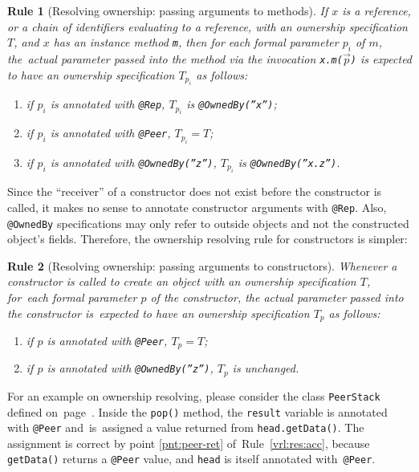 \documentclass{pracamgr}
\theoremstyle{break}
\theoremstyle{break}
\theoremstyle{break}
\newtheorem{verrule}{Rule}
\begin{document}
\begin{verrule}[Resolving ownership: passing arguments to methods]
  If $x$ is a reference, or a chain of identifiers evaluating to a
  reference, with an ownership specification $T$, and $x$ has an
  instance method \texttt{m}, then for each formal parameter $p_i$ of
  $m$, the~actual parameter passed into the method via the invocation
  \texttt{x.m($\vec{p}$)} is expected to have an ownership
  specification $T_{p_i}$ as follows:
  \begin{enumerate}[label=(\arabic*)]
  \item if $p_i$ is annotated with \texttt{@Rep}, $T_{p_i}$ is
    \texttt{@OwnedBy(''x'')};
  \item if $p_i$ is annotated with \texttt{@Peer}, $T_{p_i} = T$;
  \item if $p_i$ is annotated with \texttt{@OwnedBy(''z'')}, $T_{p_i}$
    is \texttt{@OwnedBy(''x.z'')}.
  \end{enumerate}
\end{verrule}

Since the ``receiver'' of a constructor does not exist before the
constructor is called, it makes no sense to annotate constructor
arguments with \texttt{@Rep}. Also, \texttt{@OwnedBy} specifications
may only refer to outside objects and not the constructed object's
fields. Therefore, the ownership resolving rule for constructors is
simpler:

\begin{verrule}[Resolving ownership: passing arguments to constructors]
  Whenever a constructor is called to create an object with an
  ownership specification $T$, for~each formal parameter $p$ of the
  constructor, the actual parameter passed into the constructor
  is~expected to have an ownership specification $T_p$ as follows:
  \begin{enumerate}[label=(\arabic*)]
  \item if $p$ is annotated with \texttt{@Peer}, $T_p = T$;
  \item if $p$ is annotated with \texttt{@OwnedBy(''z'')}, $T_p$ is
    unchanged.
  \end{enumerate}
\end{verrule}

For an example on ownership resolving, please consider the class
\texttt{PeerStack} defined on~page~\pageref{lst:stack-peer}. Inside
the \texttt{pop()} method, the \texttt{result} variable is annotated
with \texttt{@Peer} and~is~assigned a value returned from
\texttt{head.getData()}. The assignment is correct by point
\ref{pnt:peer-ret} of~Rule~\ref{vrl:res:acc}, because
\texttt{getData()} returns a \texttt{@Peer} value, and \texttt{head}
is itself annotated with~\texttt{@Peer}.
\end{document}

